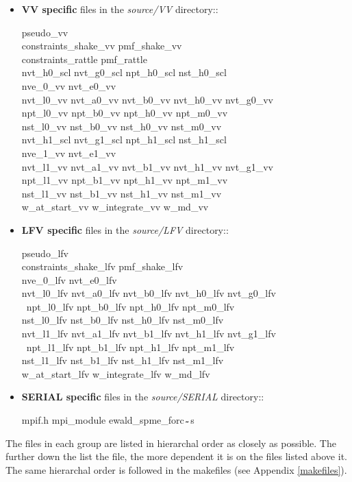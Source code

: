 \begin{itemize}
\item {\bf VV specific} files in the {\em source/VV} directory::

{\sc
pseudo\_vv \\
constraints\_shake\_vv pmf\_shake\_vv \\
constraints\_rattle pmf\_rattle \\
nvt\_h0\_scl nvt\_g0\_scl npt\_h0\_scl nst\_h0\_scl \\
nve\_0\_vv  nvt\_e0\_vv \\
nvt\_l0\_vv nvt\_a0\_vv nvt\_b0\_vv nvt\_h0\_vv nvt\_g0\_vv \\
npt\_l0\_vv npt\_b0\_vv npt\_h0\_vv npt\_m0\_vv \\
nst\_l0\_vv nst\_b0\_vv nst\_h0\_vv nst\_m0\_vv \\
nvt\_h1\_scl nvt\_g1\_scl npt\_h1\_scl nst\_h1\_scl \\
nve\_1\_vv  nvt\_e1\_vv \\
nvt\_l1\_vv nvt\_a1\_vv nvt\_b1\_vv nvt\_h1\_vv nvt\_g1\_vv \\
npt\_l1\_vv npt\_b1\_vv npt\_h1\_vv npt\_m1\_vv \\
nst\_l1\_vv nst\_b1\_vv nst\_h1\_vv nst\_m1\_vv \\
w\_at\_start\_vv w\_integrate\_vv  w\_md\_vv}

\item {\bf LFV specific} files in the {\em source/LFV} directory::

{\sc
pseudo\_lfv \\
constraints\_shake\_lfv pmf\_shake\_lfv \\
nve\_0\_lfv nvt\_e0\_lfv \\
nvt\_l0\_lfv nvt\_a0\_lfv nvt\_b0\_lfv nvt\_h0\_lfv nvt\_g0\_lfv \\\
npt\_l0\_lfv npt\_b0\_lfv npt\_h0\_lfv npt\_m0\_lfv \\
nst\_l0\_lfv nst\_b0\_lfv nst\_h0\_lfv nst\_m0\_lfv \\
nvt\_l1\_lfv nvt\_a1\_lfv nvt\_b1\_lfv nvt\_h1\_lfv nvt\_g1\_lfv \\\
npt\_l1\_lfv npt\_b1\_lfv npt\_h1\_lfv npt\_m1\_lfv \\
nst\_l1\_lfv nst\_b1\_lfv nst\_h1\_lfv nst\_m1\_lfv \\
w\_at\_start\_lfv w\_integrate\_lfv  w\_md\_lfv}

\item {\bf SERIAL specific} files in the {\em source/SERIAL} directory::

{\sc mpif.h mpi\_module ewald\_spme\_forc$_{\verb"~"}$s}

\end{itemize}
The files in each group are listed in hierarchal order as closely
as possible.  The further down the list the file, the more dependent
it is on the files listed above it.  The same hierarchal order is
followed in the makefiles (see Appendix \ref{makefiles}).

